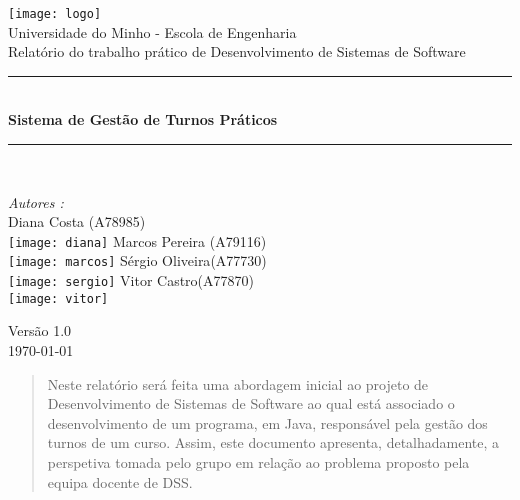 \documentclass[a4paper]{article}
\begin{document}
\begin{titlepage}
\begin{center}


\texttt{[image: logo]}\\[0.3cm]

{\large Universidade do Minho - Escola de Engenharia}\\[0.5cm]

{\large Relatório do trabalho prático de Desenvolvimento de Sistemas de Software}\\[0.5cm]



\rule{\linewidth}{0.5mm} \\[0.4cm]
{ \huge \bfseries Sistema de Gestão de Turnos Práticos \\[0.4cm] }
\rule{\linewidth}{0.5mm} \\[1.5cm]

\noindent
\begin{minipage}{0.4\textwidth}
  \begin{flushleft} \large
    \emph{Autores :}\\
    Diana Costa \textsc{(A78985)}\\
    \texttt{[image: diana]}\break
    Marcos Pereira \textsc{(A79116)}\\
    \texttt{[image: marcos]}\break
    Sérgio Oliveira\textsc{(A77730)}\\
    \texttt{[image: sergio]}\break
    Vitor Castro\textsc{(A77870)}\\
    \texttt{[image: vitor]}\break
  \end{flushleft}
\end{minipage}%
\vfill

{\large Versão 1.0 \\ \today}

\end{center}
\end{titlepage}


\begin{abstract}

\hspace{3mm}Neste relatório será feita uma abordagem inicial ao projeto de Desenvolvimento de Sistemas de Software ao qual está associado o desenvolvimento de um programa, em Java, responsável pela gestão dos turnos de um curso. Assim, este documento apresenta, detalhadamente, a perspetiva tomada pelo grupo em relação ao problema proposto pela equipa docente de DSS.

\end{abstract}
\end{document}
